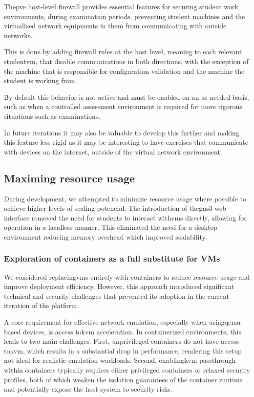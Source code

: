         The\ac{pve} host-level firewall provides essential features for securing student work environments, during examination 
        periods, preventing student machines and the virtualized network equipments in them from communicating with outside networks.

        This is done by adding firewall rules at the host level, meaning to each relevant student\ac{vm}, that disable communications
        in both directions, with the exception of the machine that is responsible for configuration validation and the machine the student is 
        working from.

        By default this behavior is not active and must be enabled on an as-needed basis, such as when a controlled assessment 
        environment is required for more rigorous situations such as examinations.

        In future iterations it may also be valuable to develop this further and making this feature less rigid as it may be interesting 
        to have exercises that communicate with devices on the internet, outside of the virtual network environment.
    
    \subsection{Maximing resource usage}
        
        During development, we attempted to minimize resource usage where possible to achieve higher levels of scaling potencial. 
        The introduction of the\ac{gns3} web interface removed the need for students to interact with\ac{vm}s directly, allowing for 
        operation in a headless manner. This eliminated the need for a desktop environment reducing memory overhead which improved scalability.
        
        \subsubsection{Exploration of containers as a full substitute for VMs}

            We considered replacing\ac{vm}s entirely with containers to reduce resource usage and improve deployment efficiency. However, 
            this approach introduced significant technical and security challenges that prevented its adoption in the current iteration of 
            the platform.

            A core requirement for effective network emulation, especially when using\ac{qemu}-based devices, is access to\ac{kvm} acceleration. 
            In containerized environments, this leads to two main challenges. First, unprivileged containers do not have access to\ac{kvm}, 
            which results in a substantial drop in performance, rendering this setup not ideal for realistic emulation workloads. Second, 
            enabling\ac{kvm} passthrough within containers typically requires either privileged containers or relaxed security profiles, 
            both of which weaken the isolation guarantees of the container runtime and potentially expose the host system to security risks.

